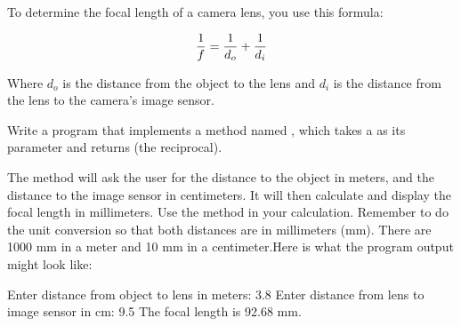 \begin{exercise}
To determine the focal length of a camera lens, you use this formula:

\begin{equation*}
{1 \over f} = {1 \over d_o} + {1 \over d_i}
\end{equation*}

Where $d_o$ is the distance from the object to the lens and $d_i$ is the distance from the lens to the camera's image sensor.

Write a program that implements a method named , which takes a  as its parameter and returns  (the reciprocal).

The  method will ask the user for the distance to the object in meters, and the distance to the image sensor in centimeters. It will then calculate and display the focal length in millimeters. Use the  method in your calculation. Remember to do the unit conversion so that both distances are in millimeters (mm). There are 1000 mm in a meter and 10 mm in a centimeter.Here is what the program output might look like:

\begin{stdout}
Enter distance from object to lens in meters: 3.8
Enter distance from lens to image sensor in cm: 9.5
The focal length is 92.68 mm.
\end{stdout}

\end{exercise}

